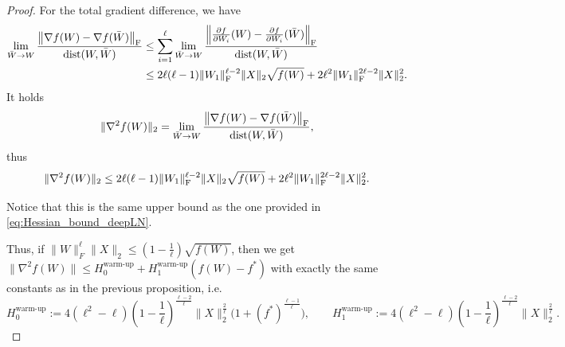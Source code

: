 \documentclass[a4paper,11pt]{article}
\newcommand{\1}{\mathbbm{1}}
\theoremstyle{plain}
\begin{document}
\begin{proof}
For the total gradient difference, we have
\begin{align*}
  \lim_{\bar W \rightarrow W}\frac{\left\|\nabla f(W)-\nabla f(\bar W) \right\|_{\rm F}}{\textnormal{dist}(W,\bar W)} & \leq \sum_{i=1}^\ell \lim_{\bar W \rightarrow W}\frac{\left\|\frac{\partial f}{\partial W_i}(W)-\frac{\partial f}{\partial W_i}(\bar W) \right\|_{\rm F}}{\textnormal{dist}(W,\bar W)} \\ &  \leq 2 \ell (\ell-1) \|W_1\|_{\rm F}^{\ell-2} \|X\|_2 \sqrt{f(W)} + 2 \ell^2 \|W_1\|_{\rm F}^{2 \ell-2} \|X\|_2^2.
\end{align*}
It holds
\begin{equation*}
    \|\nabla^2 f(W) \|_2 = \lim_{\bar W \rightarrow W}\frac{\left\|\nabla f(W)-\nabla f(\bar W) \right\|_{\rm F}}{\textnormal{dist}(W,\bar W)},
\end{equation*}
thus
\begin{equation}
\label{eq:Hessian_bound_non_linear}
    \|\nabla^2 f(W)\|_2 \leq 2 \ell (\ell-1) \|W_1\|_{\rm F}^{\ell-2} \|X\|_2 \sqrt{f(W)} + 2 \ell^2 \|W_1\|_{\rm F}^{2 \ell-2} \|X\|_2^2.
\end{equation}

Notice that this is the same upper bound as the one provided in \eqref{eq:Hessian_bound_deepLN}.

Thus, if $\|W\|_F^{\ell} \|X\|_2 \leq (1-\frac{1}{\ell}) \sqrt{f(W)}$, then we get $\|\nabla^2 f(W)\| \leq H_0^{\text{warm-up}} + H_1^{\text{warm-up}} (f(W)-f^*)$ with exactly the same constants as in the previous proposition, i.e.
\begin{equation}
\label{eq:warmup_constants_nonlinear_network}
H_0^{\text{warm-up}}:=4(\ell^2-\ell) \left(1-\frac{1}{\ell}\right)^{\frac{\ell-2}{\ell}} \|X\|_2^{\frac{2}{\ell}}\bigl(1+(f^*)^{\frac{\ell-1}{\ell}}\bigr), \qquad H_1^{\text{warm-up}}:= 4 (\ell^2-\ell) \left(1-\frac{1}{\ell}\right)^{\frac{\ell-2}{\ell}} \|X\|_2^{\frac{2}{\ell}}.
\end{equation}







\end{proof}
\end{document}

